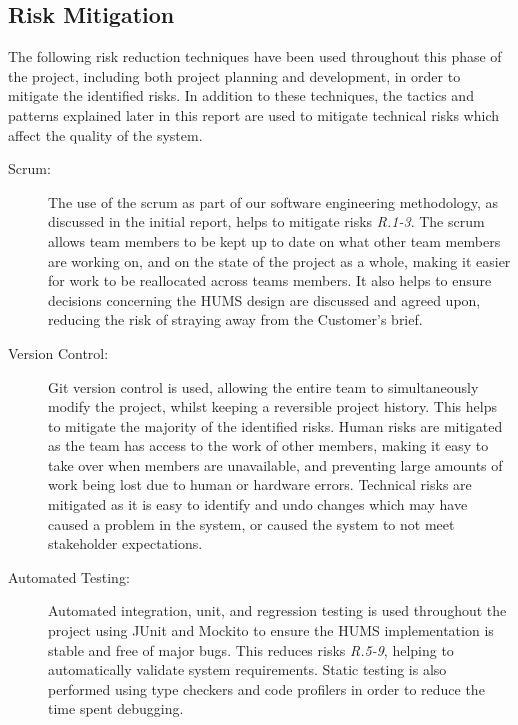 \documentclass[10pt,a4paper]{article}
\begin{document}
\subsection{Risk Mitigation}
The following risk reduction techniques have been used throughout this phase of the project, including both project planning and development, in order to mitigate the identified risks. In addition to these techniques, the tactics and patterns explained later in this report are used to mitigate technical risks which affect the quality of the system.
\begin{description}
\item[Scrum:]
The use of the scrum as part of our software engineering methodology, as discussed in the initial report, helps to mitigate risks \emph{R.1-3}. The scrum allows team members to be kept up to date on what other team members are working on, and on the state of the project as a whole, making it easier for work to be reallocated across teams members. It also helps to ensure decisions concerning the HUMS design are discussed and agreed upon, reducing the risk of straying away from the Customer's brief.

\item[Version Control:]
Git version control is used, allowing the entire team to simultaneously modify the project, whilst keeping a reversible project history. This helps to mitigate the majority of the identified risks. Human risks are mitigated as the team has access to the work of other members, making it easy to take over when members are unavailable, and preventing large amounts of work being lost due to human or hardware errors. Technical risks are mitigated as it is easy to identify and undo changes which may have caused a problem in the system, or caused the system to not meet stakeholder expectations.

\item[Automated Testing:] 
Automated integration, unit, and regression testing is used throughout the project using JUnit and Mockito to ensure the HUMS implementation is stable and free of major bugs. This reduces risks \emph{R.5-9}, helping to automatically validate system requirements. 
Static testing is also performed using type checkers and code profilers in order to reduce the time spent debugging.
\end{description}

\end{document}
